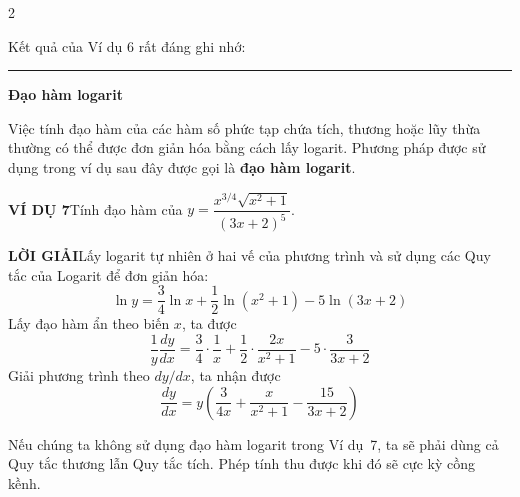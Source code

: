 \setcolumnwidth{46mm, 122mm}
\setlength{\columnsep}{10mm}

\begin{paracol}{2}
\switchcolumn[1]

Kết quả của Ví dụ 6 rất đáng ghi nhớ:

\vspace{0.2ex}
\noindent
\begin{minipage}{\linewidth}
  \makebox[0pt][l]{%
    \tikz[baseline=-0.6ex]{%
      \node[draw=stewartred, line width=0.8pt, inner sep=2.5pt, minimum size=5.2mm] {\bfseries\textcolor{stewartred}{4}};
    }%
  }%
  \centering
\end{minipage}
\vspace{0.8ex}

\noindent\textcolor{stewartblue}{\rule{1.2ex}{1.2ex}}\hspace{0.5em}\textbf{\large Đạo hàm logarit}

Việc tính đạo hàm của các hàm số phức tạp chứa tích, thương hoặc lũy thừa thường có thể được đơn giản hóa bằng cách lấy logarit. Phương pháp được sử dụng trong ví dụ sau đây được gọi là \textbf{đạo hàm logarit}.

\vspace{0.5ex}
\noindent\textbf{\textcolor{stewartblue}{VÍ DỤ 7}}\hspace{1em}Tính đạo hàm của $y = \dfrac{x^{3/4}\sqrt{x^2+1}}{(3x+2)^5}$.

\vspace{0.5ex}
\noindent\textbf{\textcolor{stewartblue}{LỜI GIẢI}}\hspace{1em}Lấy logarit tự nhiên ở hai vế của phương trình và sử dụng các Quy tắc của Logarit để đơn giản hóa:
\[
\ln y = \frac{3}{4}\ln x + \frac{1}{2}\ln(x^2+1) - 5\ln(3x+2)
\]
Lấy đạo hàm ẩn theo biến $x$, ta được
\[
\frac{1}{y}\frac{dy}{dx} = \frac{3}{4}\cdot\frac{1}{x} + \frac{1}{2}\cdot\frac{2x}{x^2+1} - 5\cdot\frac{3}{3x+2}
\]
Giải phương trình theo $dy/dx$, ta nhận được
\[
\frac{dy}{dx} = y \left( \frac{3}{4x} + \frac{x}{x^2+1} - \frac{15}{3x+2} \right)
\]

\switchcolumn*
\switchcolumn[0]
\begin{flushleft}
\sffamily\footnotesize\color{black!90}
Nếu chúng ta không sử dụng đạo hàm logarit trong Ví dụ~7, ta sẽ phải dùng cả Quy tắc thương lẫn Quy tắc tích. Phép tính thu được khi đó sẽ cực kỳ cồng kềnh.
\end{flushleft}


\end{paracol}
